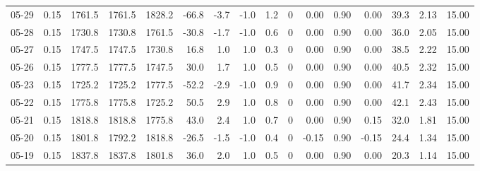 \begin{threeparttable}
{\begin{tabular}{lrrrrrrrrrrrrrrr}
  05-29 &     0.15 & 1761.5 & 1761.5 & 1828.2 &      -66.8 &           -3.7 &                     -1.0 &                 1.2 &              0 &       0.00 &      0.90 &           0.00 &             39.3 &            2.13 &                  15.00 \\
  05-28 &     0.15 & 1730.8 & 1730.8 & 1761.5 &      -30.8 &           -1.7 &                     -1.0 &                 0.6 &              0 &       0.00 &      0.90 &           0.00 &             36.0 &            2.05 &                  15.00 \\
  05-27 &     0.15 & 1747.5 & 1747.5 & 1730.8 &       16.8 &            1.0 &                      1.0 &                 0.3 &              0 &       0.00 &      0.90 &           0.00 &             38.5 &            2.22 &                  15.00 \\
  05-26 &     0.15 & 1777.5 & 1777.5 & 1747.5 &       30.0 &            1.7 &                      1.0 &                 0.5 &              0 &       0.00 &      0.90 &           0.00 &             40.5 &            2.32 &                  15.00 \\
  05-23 &     0.15 & 1725.2 & 1725.2 & 1777.5 &      -52.2 &           -2.9 &                     -1.0 &                 0.9 &              0 &       0.00 &      0.90 &           0.00 &             41.7 &            2.34 &                  15.00 \\
  05-22 &     0.15 & 1775.8 & 1775.8 & 1725.2 &       50.5 &            2.9 &                      1.0 &                 0.8 &              0 &       0.00 &      0.90 &           0.00 &             42.1 &            2.43 &                  15.00 \\
  05-21 &     0.15 & 1818.8 & 1818.8 & 1775.8 &       43.0 &            2.4 &                      1.0 &                 0.7 &              0 &       0.00 &      0.90 &           0.15 &             32.0 &            1.81 &                  15.00 \\
  05-20 &     0.15 & 1801.8 & 1792.2 & 1818.8 &      -26.5 &           -1.5 &                     -1.0 &                 0.4 &              0 &      -0.15 &      0.90 &          -0.15 &             24.4 &            1.34 &                  15.00 \\
  05-19 &     0.15 & 1837.8 & 1837.8 & 1801.8 &       36.0 &            2.0 &                      1.0 &                 0.5 &              0 &       0.00 &      0.90 &           0.00 &             20.3 &            1.14 &                  15.00 \\

\end{tabular}}
\end{threeparttable}
